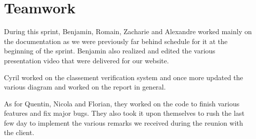 \section{Teamwork}

During this sprint, Benjamin, Romain, Zacharie and Alexandre worked mainly on the documentation as we were previously far behind schedule for it at the beginning of the sprint. Benjamin also realized and edited the various presentation video that were delivered for our website. \newline

Cyril worked on the classement verification system and once more updated the various diagram and worked on the report in general. \newline

As for Quentin, Nicola and Florian, they worked on the code to finish various features and fix major bugs. They also took it upon themselves to rush the last few day to implement the various remarks we received during the reunion with the client.
